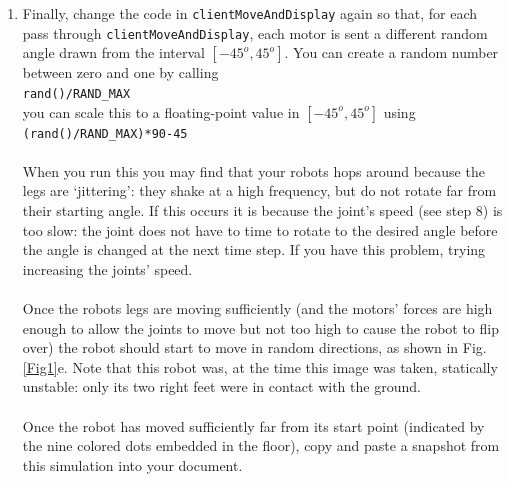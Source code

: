 \documentclass[12pt]{article}
\begin{document}
\begin{enumerate}
\item Finally, change the code in \texttt{clientMoveAndDisplay} again so that, for each pass through \verb|clientMoveAndDisplay|, each motor is sent a different random angle drawn from the interval $[-45^o,45^o]$. You can create a random number between zero and one by calling \\
    \texttt{rand()/RAND\_MAX} \\
    you can scale this to a floating-point value in $[-45^o,45^o]$ using \\
    \texttt{(rand()/RAND\_MAX)*90-45} \\ \\
    When you run this you may find that your robots hops around because the legs are `jittering': they shake at a high frequency, but do not rotate far from their starting angle. If this occurs it is because the joint's speed (see step 8) is too slow: the joint does not have to time to rotate to the desired angle before the angle is changed at the next time step. If you have this problem, trying increasing the joints' speed. \\ \\
    Once the robots legs are moving sufficiently (and the motors' forces are high enough to allow the joints to move but not too high to cause the robot to flip over) the robot should start to move in random directions, as shown in Fig. \ref{Fig1}e. Note that this robot was, at the time this image was taken, statically unstable: only its two right feet were in contact with the ground. \\ \\
    Once the robot has moved sufficiently far from its start point (indicated by the nine colored dots embedded in the floor), copy and paste a snapshot from this simulation into your document.

\end{enumerate}
\end{document}
